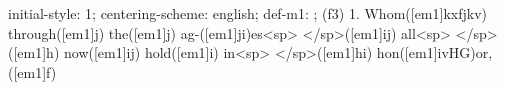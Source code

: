 initial-style: 1;
centering-scheme: english;
def-m1: \grealign;
(f3) 1. Whom([em1]kxfjkv) through([em1]j) the([em1]j) ag-([em1]ji)es<sp> </sp>([em1]ij) all<sp> </sp>([em1]h) now([em1]ij) hold([em1]i) in<sp> </sp>([em1]hi) hon([em1]ivHG)or,([em1]f)